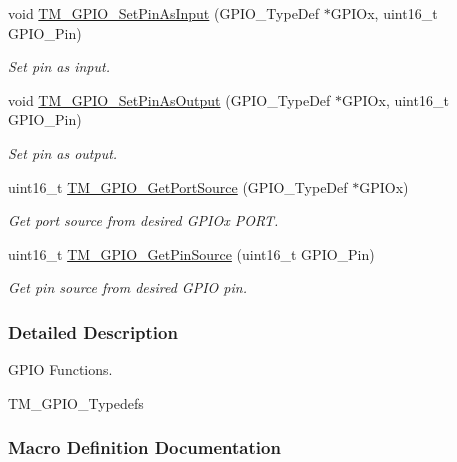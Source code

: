 \begin{DoxyCompactItemize}
void \hyperlink{group___t_m___g_p_i_o___functions_ga9c5ca4f894b1f46d413d2bfc692fcf43}{T\+M\+\_\+\+G\+P\+I\+O\+\_\+\+Set\+Pin\+As\+Input} (G\+P\+I\+O\+\_\+\+Type\+Def $\ast$G\+P\+I\+Ox, uint16\+\_\+t G\+P\+I\+O\+\_\+\+Pin)
\begin{DoxyCompactList}\small\item\em Set pin as input. \end{DoxyCompactList}\item 
void \hyperlink{group___t_m___g_p_i_o___functions_gabfa399cb17386714bd9c395a81b43035}{T\+M\+\_\+\+G\+P\+I\+O\+\_\+\+Set\+Pin\+As\+Output} (G\+P\+I\+O\+\_\+\+Type\+Def $\ast$G\+P\+I\+Ox, uint16\+\_\+t G\+P\+I\+O\+\_\+\+Pin)
\begin{DoxyCompactList}\small\item\em Set pin as output. \end{DoxyCompactList}\item 
uint16\+\_\+t \hyperlink{group___t_m___g_p_i_o___functions_gaa5a2f30f33cc19408daeb5db3b7cb59c}{T\+M\+\_\+\+G\+P\+I\+O\+\_\+\+Get\+Port\+Source} (G\+P\+I\+O\+\_\+\+Type\+Def $\ast$G\+P\+I\+Ox)
\begin{DoxyCompactList}\small\item\em Get port source from desired G\+P\+I\+Ox P\+O\+R\+T. \end{DoxyCompactList}\item 
uint16\+\_\+t \hyperlink{group___t_m___g_p_i_o___functions_ga29aaed3ba7054d4c3a3fed55012403e5}{T\+M\+\_\+\+G\+P\+I\+O\+\_\+\+Get\+Pin\+Source} (uint16\+\_\+t G\+P\+I\+O\+\_\+\+Pin)
\begin{DoxyCompactList}\small\item\em Get pin source from desired G\+P\+I\+O pin. \end{DoxyCompactList}\end{DoxyCompactItemize}


\subsubsection{Detailed Description}
G\+P\+I\+O Functions. 

T\+M\+\_\+\+G\+P\+I\+O\+\_\+\+Typedefs 

\subsubsection{Macro Definition Documentation}
\hypertarget{group___t_m___g_p_i_o___functions_gacd91a02149d1f1bc648a3fe06648460d}{}
